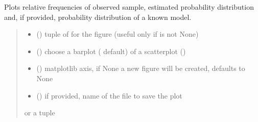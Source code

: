 \documentclass[letterpaper,10pt,english]{sphinxmanual}
\begin{document}
\begin{fulllineitems}
\begin{fulllineitems}
\label{\detokenize{cubmods:cubmods.cube.CUBresCUBE.plot_ordinal}}
\pysigstartsignatures
{}
\pysigstopsignatures
\sphinxAtStartPar
Plots relative frequencies of observed sample, estimated probability distribution and,
if provided, probability distribution of a known model.
\begin{quote}\begin{description}
\begin{itemize}
\item {} 
\sphinxAtStartPar
{} () \textendash{} tuple of  for the figure (useful only if  is not None)

\item {} 
\sphinxAtStartPar
{} () \textendash{} choose a barplot ( default) of a scatterplot ()

\item {} 
\sphinxAtStartPar
{} (\sphinxstyleliteralemphasis{\sphinxupquote{, }}) \textendash{} matplotlib axis, if None a new figure will be created, defaults to None

\item {} 
\sphinxAtStartPar
{} () \textendash{} if provided, name of the file to save the plot

\end{itemize}

\sphinxAtStartPar
{} or a tuple 

\end{description}\end{quote}

\end{fulllineitems}


\end{fulllineitems}
\end{document}
